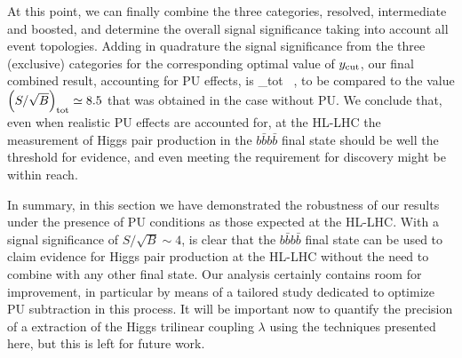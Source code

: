 At this point, we can finally combine the three categories, resolved,
intermediate and boosted, and determine the overall signal
significance taking into account all event topologies.
%
Adding in quadrature the signal significance from the three
(exclusive) categories for the corresponding
optimal value of $y_{\rm cut}$, our final combined result, accounting
for PU effects, is
\be
\lp {}\rp_{\rm tot}  \, ,
\ee
to be compared to the value $\left( S/\sqrt{B}\right)_{\rm tot} \simeq 8.5$
that was obtained in the case without PU.
%
We conclude that, even when realistic PU effects are accounted
for, at the HL-LHC the measurement of
Higgs pair production in the $b\bar{b}b\bar{b}$ final state should be 
well the threshold for evidence, and even meeting the
requirement for discovery might be within reach.
%

In summary, in this section we have demonstrated the robustness
of our results under the presence of PU conditions as those
expected at the HL-LHC.
%
With a signal significance of $S/\sqrt{B}\sim 4$, is clear that
the $b\bar{b}b\bar{b}$ final state can be used to claim evidence
for Higgs pair production at the HL-LHC without the need
to combine with any other final state.
%
Our analysis certainly contains
room for improvement, in particular by means of a tailored
study dedicated to optimize PU subtraction in this process.
%
It will be important now to quantify the precision of
a extraction of the Higgs trilinear coupling $\lambda$ using
the techniques presented here, but this is left for future work.

